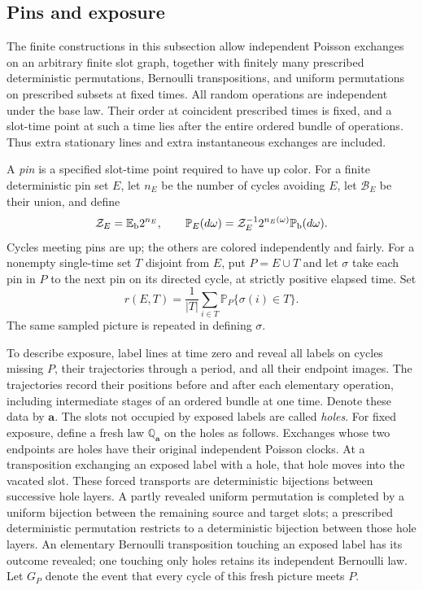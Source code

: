 \subsection{Pins and exposure}

The finite constructions in this subsection allow independent Poisson
exchanges on an arbitrary finite slot graph, together with finitely many
prescribed deterministic permutations, Bernoulli transpositions, and
uniform permutations on prescribed subsets at fixed times.  All random operations are
independent under the base law.  Their order at
coincident prescribed times is fixed, and a slot-time point at such a
time lies after the entire ordered bundle of operations.  Thus extra stationary lines and
extra instantaneous exchanges are included.

A \emph{pin} is a specified slot-time point required to have up color.
For a finite deterministic pin set $E$, let $n_E$ be the number of
cycles avoiding $E$, let $\mathcal B_E$ be their union, and define
\begin{equation}\label{eq:pin-law}
 \mathcal Z_E=\mathbb E_{\rm b}2^{n_E},\qquad
       \mathbb P_E(d\omega)
         =\mathcal Z_E^{-1}2^{n_E(\omega)}\mathbb P_{\rm b}(d\omega).
\end{equation}
Cycles meeting pins are up; the others are colored independently and
fairly.  For a nonempty single-time set $T$ disjoint from $E$, put
$P=E\cup T$ and let $\sigma$ take each pin in $P$ to the next pin
on its directed cycle, at strictly positive elapsed time.  Set
\begin{equation}\label{eq:pin-return}
       r(E,T)=\frac1{|T|}\sum_{i\in T}
                              \mathbb P_P\{\sigma(i)\in T\}.
\end{equation}
The same sampled picture is repeated in defining $\sigma$.

To describe exposure, label lines at time zero and reveal all labels on
cycles missing $P$, their trajectories through a period, and all their
endpoint images.  The trajectories record their positions before and
after each elementary operation, including intermediate stages of an
ordered bundle at one time.  Denote these data by $\mathbf a$.  The slots not
occupied by exposed labels are called \emph{holes}.  For fixed exposure,
define a fresh law $\mathbb Q_{\mathbf a}$ on the holes as follows.
Exchanges whose two endpoints are holes have their original independent
Poisson clocks.  At a transposition exchanging an exposed label with a
hole, that hole moves into the vacated slot.  These forced transports are deterministic
bijections between successive hole layers.  A partly revealed uniform
permutation is completed by a uniform bijection between the remaining
source and target slots; a prescribed deterministic permutation restricts
to a deterministic bijection between those hole layers.
An elementary Bernoulli transposition touching
an exposed label has its outcome revealed; one touching only holes
retains its independent Bernoulli law.  Let $G_P$ denote the event that
every cycle of this fresh picture meets $P$.


